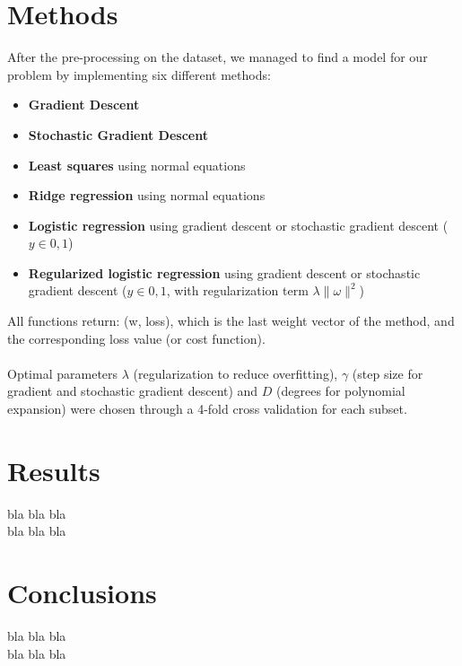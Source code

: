 \documentclass[10pt,conference,compsocconf]{IEEEtran}
\begin{document}
\section{Methods}
After the pre-processing on the dataset, we managed to find a model for our problem by implementing six different methods:
\begin{itemize}
    \item \textbf{Gradient Descent}
    \item \textbf{Stochastic Gradient Descent}
    \item \textbf{Least squares} using normal equations
    \item \textbf{Ridge regression} using normal equations
    \item \textbf{Logistic regression} using gradient descent or stochastic gradient descent ($y \in {0,1}$)
    \item \textbf{Regularized logistic regression} using gradient descent or stochastic gradient descent ($y \in {0,1}$, with regularization term $ \lambda  \| \omega \|^2$)
\end{itemize}
All functions return: (w, loss), which is the last weight vector of the
method, and the corresponding loss value (or cost function).\\
\vspace{0.05cm}\\
Optimal parameters $\lambda$ (regularization to reduce overfitting), $\gamma$ (step size for gradient and stochastic gradient descent) and $D$ (degrees for polynomial expansion) were chosen through a 4-fold cross validation for each subset.



\section{Results}

bla bla bla\\
bla bla bla\\

\section{Conclusions}

bla bla bla\\
bla bla bla\\





\end{document}
